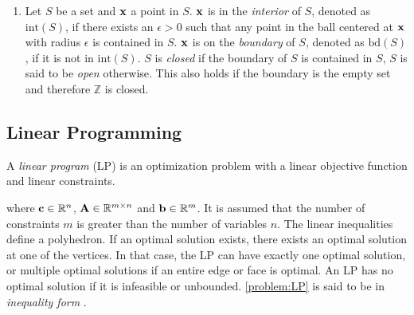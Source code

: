 \begin{enumerate}
    \item Let $S$ be a set and $\bold x$ a point in $S$. $\bold x$ is in the \textit{interior} of $S$, denoted as $\text{int}(S)$, if there exists an $\epsilon > 0$ such that any point in the ball centered at $\bold x$ with radius $\epsilon$ is contained in $S$. $\bold x$ is on the \textit{boundary} of $S$, denoted as $\text{bd}(S)$, if it is not in $\text{int}(S)$. $S$ is \textit{closed} if the boundary of $S$ is contained in $S$, $S$ is said to be \textit{open} otherwise. %
    This also holds if the boundary is the empty set and therefore $\mathbb{Z}$ is closed.
\end{enumerate}

\subsection{Linear Programming} \label{section:Linear Programming}
A \textit{linear program} (LP) is an optimization problem with a linear objective function and linear constraints.


\quad where $\bold c \in \mathbb{R}^n$, $ \bold A \in \mathbb{R}^{m \times n}$ and $\bold b \in \mathbb{R}^m$. It is assumed that the number of constraints $m$ is greater than the number of variables $n$. %
The linear inequalities define a polyhedron. If an optimal solution exists, there exists an optimal solution at one of the vertices. In that case, the LP can have exactly one optimal solution, or multiple optimal solutions if an entire edge or face is optimal. An LP has no optimal solution if it is infeasible or unbounded.
\cref{problem:LP} is said to be in \textit{inequality form}%
.

